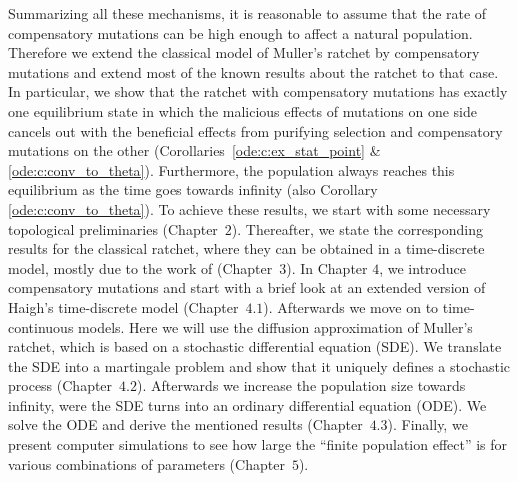 Summarizing all these mechanisms, it is reasonable to assume that the rate of
compensatory mutations can be high enough to affect a natural population.
Therefore we extend the classical model of Muller's ratchet by compensatory
mutations and extend most of the known results about the ratchet to that case.
In particular, we show that the ratchet with compensatory mutations has exactly one
equilibrium state in which the malicious effects of mutations on one side
cancels out with the beneficial effects from purifying selection and
compensatory mutations on the other (Corollaries~\ref{ode:c:ex_stat_point} \&
\ref{ode:c:conv_to_theta}). Furthermore, the population always reaches
this equilibrium as the time goes towards infinity (also Corollary
\ref{ode:c:conv_to_theta}). To achieve these results, we start with some
necessary topological preliminaries (Chapter~$2$). Thereafter, we state the
corresponding results for the classical ratchet, where they can be obtained in a
time-discrete model, mostly due to the work of \cite{maia_analytical_2003}
(Chapter~$3$). In Chapter $4$, we introduce compensatory mutations and start
with a brief look at an extended version of Haigh's time-discrete model
(Chapter~$4.1$). Afterwards we move on to time-continuous models. Here we
will use the diffusion approximation of Muller's ratchet, which is based on a
stochastic differential equation (SDE). We translate the SDE into a martingale
problem and show that it uniquely defines a stochastic process (Chapter~$4.2$).
Afterwards we increase the population size towards infinity, were the SDE turns
into an ordinary differential equation (ODE). We solve the ODE and derive the
mentioned results (Chapter~$4.3$). Finally, we present computer simulations
to see how large the ``finite population effect'' is for various combinations
of parameters (Chapter~$5$).